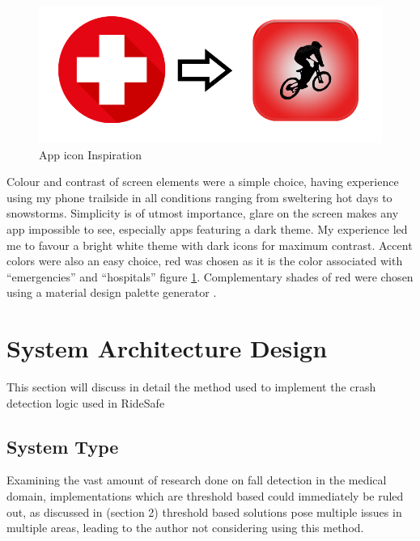 \begin{figure}
\begin{center}
\includegraphics[scale = .5] {design/logo.png}
\end{center}
\caption{App icon Inspiration}
\label{logo}
\end{figure}


Colour and contrast of screen elements were a simple choice, having experience using my phone trailside in all conditions ranging from sweltering hot days to snowstorms. Simplicity is of utmost importance, glare on the screen makes any app impossible to see, especially apps featuring a dark theme.  My experience led me to favour a bright white theme with dark icons for maximum contrast. Accent colors were also an easy choice,  red was chosen as it is the color associated with “emergencies”  and “hospitals” figure \ref{logo}. Complementary shades of red were chosen using a material design palette generator \cite{color}.





\section{System Architecture Design}

This section will discuss in detail the method used to implement the crash detection logic used in RideSafe



\subsection{System Type}

Examining the vast amount of research done on fall detection in the medical domain, implementations which are threshold based could immediately be ruled out, as discussed in (section 2) threshold based solutions pose multiple issues in multiple areas, leading to the author not considering using this method.


